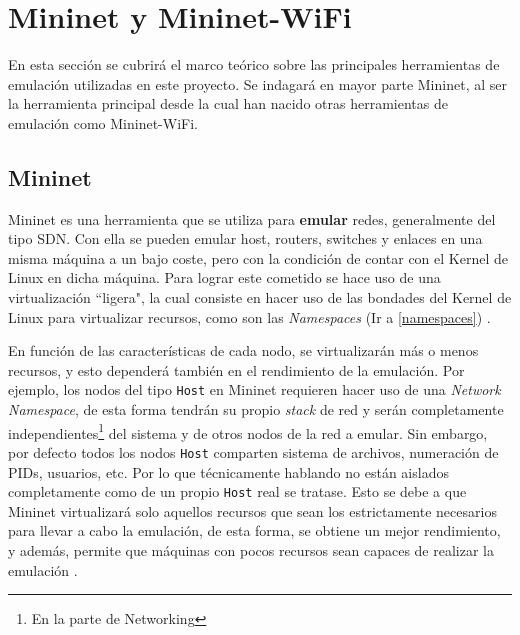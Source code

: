\section{Mininet y Mininet-WiFi}
\label{mininet}

En esta sección se cubrirá el marco teórico sobre las principales herramientas de emulación utilizadas en este proyecto. Se indagará en mayor parte Mininet, al ser la herramienta principal desde la cual han nacido otras herramientas de emulación como Mininet-WiFi.\\

\subsection{Mininet}

Mininet es una herramienta que se  utiliza para \textbf{emular} redes,  generalmente del tipo SDN. Con ella se pueden emular host, routers, switches y enlaces en una misma máquina a un bajo coste, pero con la condición de contar con el Kernel de Linux en dicha máquina. Para lograr este cometido se hace uso de una virtualización ``ligera", la cual consiste en hacer uso de las bondades del Kernel de Linux para virtualizar recursos, como son las \textit{Namespaces} (Ir a \ref{namespaces}) \cite{lantz2010network}.\\
\par
En función de las características de cada nodo, se virtualizarán más o menos recursos, y esto dependerá también en el rendimiento de la emulación. Por ejemplo, los nodos del tipo \texttt{Host} en Mininet requieren hacer uso de una \textit{Network Namespace}, de esta forma tendrán su propio \textit{stack} de red y serán completamente independientes\footnote{En la parte de Networking} del sistema y de otros nodos de la red a emular. Sin embargo, por defecto todos los nodos \texttt{Host} comparten sistema de archivos, numeración de PIDs, usuarios, etc. Por lo que técnicamente hablando no están aislados completamente como de un propio \texttt{Host} real se tratase. Esto se debe a que Mininet virtualizará solo aquellos recursos que sean los estrictamente necesarios para llevar a cabo la emulación, de esta forma, se obtiene un mejor rendimiento, y además, permite que máquinas con pocos recursos sean capaces de realizar la emulación \cite{lantz2010network}.\\
\par
